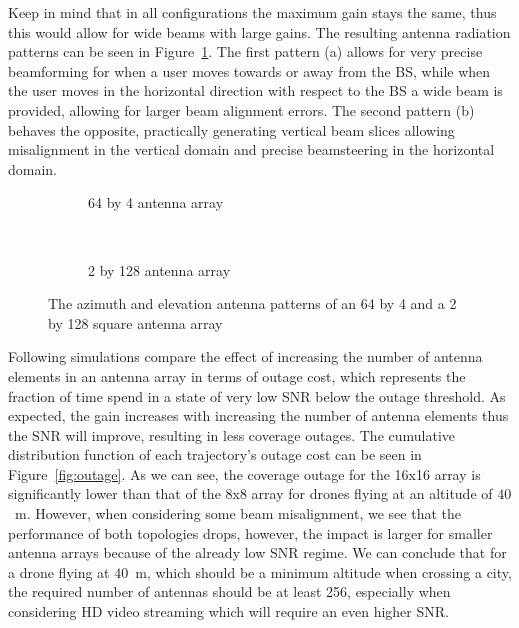 \documentclass[conference,twocolumn]{IEEEtran}
\newcommand{\sofie}[1]{{\color{red}[sp: #1]}}
\begin{document}
Keep in mind that in all configurations the maximum gain stays the same, thus this would allow for wide beams with large gains. The resulting antenna radiation patterns can be seen in Figure~\ref{fig:diff_top}. The first pattern (a) allows for very precise beamforming for when a user moves towards or away from the BS, while when the user moves in the horizontal direction with respect to the BS a wide beam is provided, allowing for larger beam alignment errors. The second pattern (b) behaves the opposite, practically generating vertical beam slices allowing misalignment in the vertical domain and precise beamsteering in the horizontal domain.
\begin{figure}[t]
\centering
\begin{subfigure}[t]{0.5\linewidth}

\caption{64 by 4 antenna array}
\end{subfigure}~
\begin{subfigure}[t]{0.5\linewidth}

\caption{2 by 128 antenna array}
\end{subfigure}
\caption{The azimuth and elevation antenna patterns of an 64 by 4 and a 2 by 128 square antenna array}
\label{fig:diff_top}
\end{figure}
\par Following simulations compare the effect of increasing the number of antenna elements in an antenna array in terms of outage cost, which represents the fraction of time spend in a state of very low SNR below the outage threshold. As expected, the gain increases with increasing the number of antenna elements thus the SNR will improve, resulting in less coverage outages. The cumulative distribution function of each trajectory's outage cost can be seen in Figure~\ref{fig:outage}. As we can see, the coverage outage for the 16x16 array is significantly lower than that of the 8x8 array for drones flying at an altitude of $40$~m. However, when considering some beam misalignment, we see that the performance of both topologies drops, however, the impact is larger for smaller antenna arrays because of the already low SNR regime. We can conclude that for a drone flying at $40$~m, which should be a minimum altitude when crossing a city, the required number of antennas should be at least 256, especially when considering HD video streaming which will require an even higher SNR.
\end{document}
